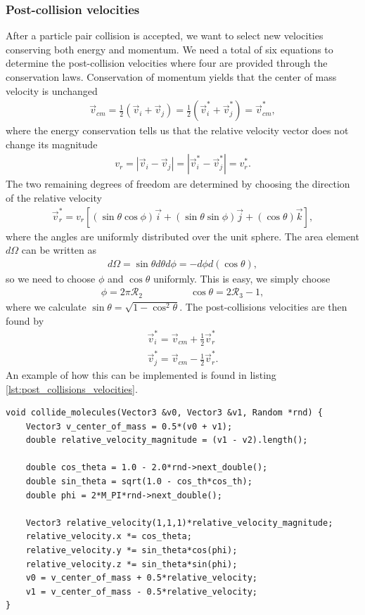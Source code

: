 \subsubsection{Post-collision velocities}
After a particle pair collision is accepted, we want to select new velocities conserving both energy and momentum. We need a total of six equations to determine the post-collision velocities where four are provided through the conservation laws. Conservation of momentum yields that the center of mass velocity is unchanged
\begin{align}
	\vec v_{cm} = \frac{1}{2}(\vec v_i + \vec v_j) = \frac{1}{2}(\vec v_i^* + \vec v_j^*) = \vec v_{cm}^*,
\end{align}
where the energy conservation tells us that the relative velocity vector does not change its magnitude
\begin{align}
	v_r = |\vec v_i - \vec v_j| = |\vec v_i^* - \vec v_j^*| = v_r^*.
\end{align}
The two remaining degrees of freedom are determined by choosing the direction of the relative velocity
\begin{align}
	\vec v_r^* = v_r\left[(\sin\theta\cos\phi)\vec i + (\sin\theta\sin\phi) \vec j + (\cos\theta)\vec k\right],
\end{align}
where the angles are uniformly distributed over the unit sphere. The area element $d\Omega$ can be written as
\begin{align}
	d\Omega = \sin\theta d\theta d\phi = -d\phi d(\cos\theta),
\end{align}
so we need to choose $\phi$ and $\cos\theta$ uniformly. This is easy, we simply choose 
\begin{align*}
	\phi = 2\pi\mathcal{R}_2 & \qquad \qquad \cos\theta = 2\mathcal{R}_3 - 1,
\end{align*}
where we calculate $\sin\theta = \sqrt{1 - \cos^2\theta}$. The post-collisions velocities are then found by
\begin{align}
	\vec v_i^* = \vec v_{cm} + \frac{1}{2}\vec v_r^*\\
	\vec v_j^* = \vec v_{cm} - \frac{1}{2}\vec v_r^*.
\end{align}
An example of how this can be implemented is found in listing \ref{lst:post_collisions_velocities}.
\begin{lstlisting}[caption=Determining post-collision velocities., label=lst:post_collisions_velocities]
void collide_molecules(Vector3 &v0, Vector3 &v1, Random *rnd) {
	Vector3 v_center_of_mass = 0.5*(v0 + v1);
	double relative_velocity_magnitude = (v1 - v2).length();
    
    double cos_theta = 1.0 - 2.0*rnd->next_double();
    double sin_theta = sqrt(1.0 - cos_th*cos_th);
    double phi = 2*M_PI*rnd->next_double();

    Vector3 relative_velocity(1,1,1)*relative_velocity_magnitude;
    relative_velocity.x *= cos_theta;
    relative_velocity.y *= sin_theta*cos(phi);
    relative_velocity.z *= sin_theta*sin(phi);
    v0 = v_center_of_mass + 0.5*relative_velocity;
    v1 = v_center_of_mass - 0.5*relative_velocity;
}
\end{lstlisting}
